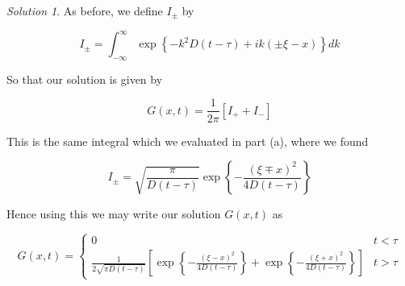 \documentclass[12pt,a4paper]{article}
\theoremstyle{definition}
\theoremstyle{remark}
\newtheorem*{solution}{Solution}
\begin{document}
\begin{solution}
    As before, we define $I_{\pm}$ by 

    $$I_{\pm} = \int_{-\infty}^\infty \exp\left\{-k^2 D(t-\tau) + ik(\pm \xi -x) \right\} dk$$

    So that our solution is given by 

    $$G(x,t) = \frac{1}{2\pi}\left[ I_+ + I_-\right]$$

    This is the same integral which we evaluated in part (a), where we found 

    $$I_{\pm} = \sqrt{\frac{\pi}{D(t-\tau)}}\exp \left\{ -\frac{(\xi\mp x)^2}{4D(t-\tau)}\right\}$$

    Hence using this we may write our solution $G(x,t)$ as 

    $$G(x,t) = \begin{cases}
        0 & t < \tau \\
        \frac{1}{2 \sqrt{\pi D(t-\tau)}} \left[\exp \left\{ - \frac{(\xi - x)^2}{4D(t-\tau)} \right\} + \exp \left\{ - \frac{(\xi + x)^2}{4D(t-\tau)} \right\} \right] & t > \tau
    \end{cases}$$
\end{solution}
\end{document}
